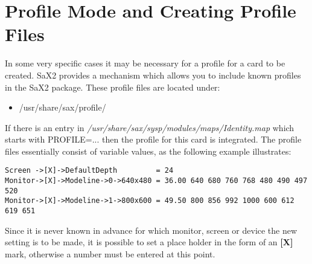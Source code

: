 \section{Profile Mode and Creating Profile Files}
In some very specific cases it may be necessary for a profile for a card to be
created. SaX2 provides a mechanism which allows you to include known profiles
in the SaX2 package. These profile files are located under:\\
\begin{itemize}
\item /usr/share/sax/profile/
\end{itemize}
If there is an entry in
\textit{/usr/share/sax/sysp/modules/maps/Identity.map} 
which starts with PROFILE=... then the profile for this card is
integrated. The profile files essentially consist of variable values, as the
following example illustrates:
\begin{verbatim}
Screen ->[X]->DefaultDepth         = 24
Monitor->[X]->Modeline->0->640x480 = 36.00 640 680 760 768 480 490 497 520
Monitor->[X]->Modeline->1->800x600 = 49.50 800 856 992 1000 600 612 619 651
\end{verbatim}
Since it is never known in advance for which monitor, screen or device the new
setting is to be made, it is possible to set a place holder in the form of an  
\textbf{[X]} mark, otherwise a number must be entered at this point. 
